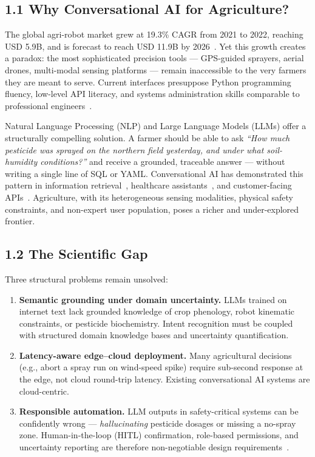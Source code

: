 \documentclass[11pt,a4paper]{article}
\begin{document}
\subsection{1.1 Why Conversational AI for Agriculture?}

The global agri-robot market grew at 19.3\% CAGR from 2021 to 2022, reaching USD 5.9B, and is
forecast to reach USD 11.9B by 2026~\cite{phd_adv_2026}. Yet this growth creates a paradox:
the most sophisticated precision tools — GPS-guided sprayers, aerial drones, multi-modal sensing
platforms — remain inaccessible to the very farmers they are meant to serve. Current interfaces
presuppose Python programming fluency, low-level API literacy, and systems administration skills
comparable to professional engineers~\cite{phd_adv_2026}.

Natural Language Processing (NLP) and Large Language Models (LLMs) offer a structurally
compelling solution. A farmer should be able to ask \emph{``How much pesticide was sprayed on the
northern field yesterday, and under what soil-humidity conditions?''} and receive a grounded, traceable
answer — without writing a single line of SQL or YAML. Conversational AI has demonstrated this
pattern in information retrieval~\cite{wagner_2025}, healthcare assistants~\cite{brown_gpt3_2020},
and customer-facing APIs~\cite{chen_2021}. Agriculture, with its heterogeneous sensing modalities,
physical safety constraints, and non-expert user population, poses a richer and under-explored frontier.

\subsection{1.2 The Scientific Gap}

Three structural problems remain unsolved:
\begin{enumerate}[leftmargin=1.2em,itemsep=1pt]
  \item \textbf{Semantic grounding under domain uncertainty.} LLMs trained on internet text lack
  grounded knowledge of crop phenology, robot kinematic constraints, or
  pesticide biochemistry. Intent recognition must be coupled with structured domain
  knowledge bases and uncertainty quantification.
  \item \textbf{Latency-aware edge–cloud deployment.} Many agricultural decisions (e.g., abort a
  spray run on wind-speed spike) require sub-second response at the edge, not cloud
  round-trip latency. Existing conversational AI systems are cloud-centric.
  \item \textbf{Responsible automation.} LLM outputs in safety-critical systems can be
  confidently wrong — \emph{hallucinating} pesticide dosages or missing a no-spray zone.
  Human-in-the-loop (HITL) confirmation, role-based permissions, and uncertainty
  reporting are therefore non-negotiable design requirements~\cite{amershi_2019,kaur_2020}.
\end{enumerate}
\end{document}
